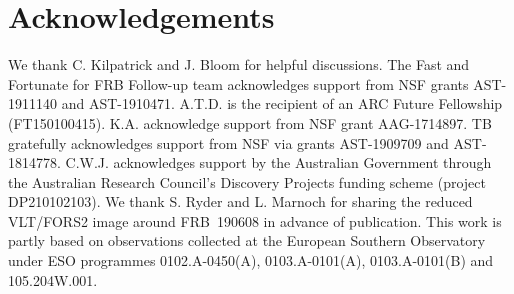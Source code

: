 \documentclass[twocolumn,linenumbers]{aastex63}
\newcommand{\mpoffset}{p(\omega|O_i)}  %
\newcommand{\poffset}{$\mpoffset$}
\begin{document}

\section*{Acknowledgements}
We thank C. Kilpatrick and J. Bloom for helpful
discussions.
The Fast and Fortunate for FRB
Follow-up team acknowledges support from 
NSF grants AST-1911140 and AST-1910471. 
A.T.D. is the recipient of an ARC Future Fellowship (FT150100415). K.A. acknowledge support from NSF grant AAG-1714897.
TB gratefully acknowledges support from NSF via grants AST-1909709 and AST-1814778.
C.W.J. acknowledges support by the Australian Government through the Australian Research Council's Discovery Projects funding scheme (project DP210102103).
We thank S. Ryder and L. Marnoch for sharing the reduced
VLT/FORS2 image around FRB~190608 in advance of publication.
This work is partly based on observations collected at the European
Southern Observatory 
under ESO programmes 0102.A-0450(A), 0103.A-0101(A), 0103.A-0101(B) and 105.204W.001.







\end{document}
